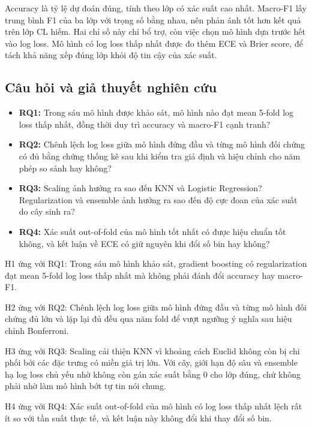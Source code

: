 \documentclass[12pt]{template/ai_conquer2026}
\begin{document}
Accuracy là tỷ lệ dự đoán đúng, tính theo lớp có xác suất cao nhất. Macro-F1 lấy
trung bình F1 của ba lớp với trọng số bằng nhau, nên phản ánh tốt hơn kết quả trên
lớp CL hiếm. Hai chỉ số này chỉ bổ trợ, còn việc chọn mô hình dựa trước hết vào log
loss. Mô hình có log loss thấp nhất được đo thêm ECE và Brier score, để tách khả
năng xếp đúng lớp khỏi độ tin cậy của xác suất.

\subsection{Câu hỏi và giả thuyết nghiên cứu}

\begin{itemize}
\item \textbf{RQ1:} Trong sáu mô hình được khảo sát, mô hình nào đạt mean 5-fold
log loss thấp nhất, đồng thời duy trì accuracy và macro-F1 cạnh tranh?
\item \textbf{RQ2:} Chênh lệch log loss giữa mô hình đứng đầu và từng mô hình đối
chứng có đủ bằng chứng thống kê sau khi kiểm tra giả định và hiệu chỉnh cho năm
phép so sánh hay không?
\item \textbf{RQ3:} Scaling ảnh hưởng ra sao đến KNN và Logistic Regression?
Regularization và ensemble ảnh hưởng ra sao đến độ cực đoan của xác suất do cây
sinh ra?
\item \textbf{RQ4:} Xác suất out-of-fold của mô hình tốt nhất có được hiệu chuẩn
tốt không, và kết luận về ECE có giữ nguyên khi đổi số bin hay không?
\end{itemize}

\begin{aivncodebox}
H1 ứng với RQ1: Trong sáu mô hình khảo sát, gradient boosting có regularization
đạt mean 5-fold log loss thấp nhất mà không phải đánh đổi accuracy hay macro-F1.

H2 ứng với RQ2: Chênh lệch log loss giữa mô hình đứng đầu và từng mô hình đối
chứng đủ lớn và lặp lại đủ đều qua năm fold để vượt ngưỡng ý nghĩa sau hiệu chỉnh
Bonferroni.

H3 ứng với RQ3: Scaling cải thiện KNN vì khoảng cách Euclid không còn bị chi phối
bởi các đặc trưng có miền giá trị lớn. Với cây, giới hạn độ sâu và ensemble hạ log
loss chủ yếu nhờ không còn gán xác suất bằng 0 cho lớp đúng, chứ không phải nhờ
làm mô hình bớt tự tin nói chung.

H4 ứng với RQ4: Xác suất out-of-fold của mô hình có log loss thấp nhất lệch rất ít
so với tần suất thực tế, và kết luận này không đổi khi thay đổi số bin.
\end{aivncodebox}
\end{document}
